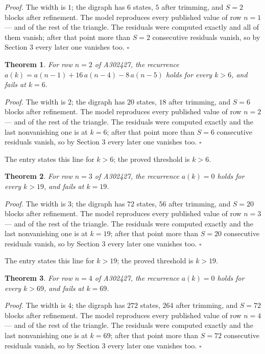 \documentclass[11pt]{article}
\newtheorem{theorem}{Theorem}
\theoremstyle{definition}
\begin{document}
{\itshape Proof.} The width is $1$; the digraph has $6$ states, $5$ after trimming, and $S = 2$ blocks after refinement. The model reproduces every published value of row $n = 1$ --- and of the rest of the triangle. The residuals were computed exactly and all of them vanish; after that point more than $S = 2$ consecutive residuals vanish, so by Section 3 every later one vanishes too. $\square$

\begin{theorem} For row $n = 2$ of A302427, the recurrence $a(k) = a(n-1) + 16\,a(n-4) - 8\,a(n-5)$ holds for every $k > 6$, and fails at $k = 6$.\end{theorem}

{\itshape Proof.} The width is $2$; the digraph has $20$ states, $18$ after trimming, and $S = 6$ blocks after refinement. The model reproduces every published value of row $n = 2$ --- and of the rest of the triangle. The residuals were computed exactly and the last nonvanishing one is at $k = 6$; after that point more than $S = 6$ consecutive residuals vanish, so by Section 3 every later one vanishes too. $\square$

The entry states this line for $k > 6$; the proved threshold is $k > 6$.

\begin{theorem} For row $n = 3$ of A302427, the recurrence $a(k) = 0$ holds for every $k > 19$, and fails at $k = 19$.\end{theorem}

{\itshape Proof.} The width is $3$; the digraph has $72$ states, $56$ after trimming, and $S = 20$ blocks after refinement. The model reproduces every published value of row $n = 3$ --- and of the rest of the triangle. The residuals were computed exactly and the last nonvanishing one is at $k = 19$; after that point more than $S = 20$ consecutive residuals vanish, so by Section 3 every later one vanishes too. $\square$

The entry states this line for $k > 19$; the proved threshold is $k > 19$.

\begin{theorem} For row $n = 4$ of A302427, the recurrence $a(k) = 0$ holds for every $k > 69$, and fails at $k = 69$.\end{theorem}

{\itshape Proof.} The width is $4$; the digraph has $272$ states, $264$ after trimming, and $S = 72$ blocks after refinement. The model reproduces every published value of row $n = 4$ --- and of the rest of the triangle. The residuals were computed exactly and the last nonvanishing one is at $k = 69$; after that point more than $S = 72$ consecutive residuals vanish, so by Section 3 every later one vanishes too. $\square$
\end{document}
